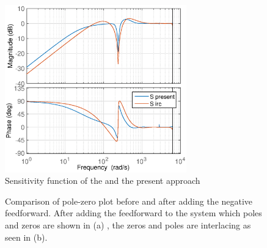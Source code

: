 \begin{figure}[h!]
  \centering
  \includegraphics[width=0.7\textwidth]{fig/matlab/sensitivity_irc.eps}
  \caption{\label{fig:sensitivity_irc} Sensitivity function of the \abbrIRC and the present approach}
\end{figure}

\begin{figure}[h!]
  \centering %
  \qquad
  \caption{\label{fig:negfeedpzmap} Comparison of pole-zero plot before and after adding the negative feedforward. After adding the feedforward to the system which poles and zeros are shown in (a) , the zeros and poles are interlacing as seen in (b).}
\end{figure}

